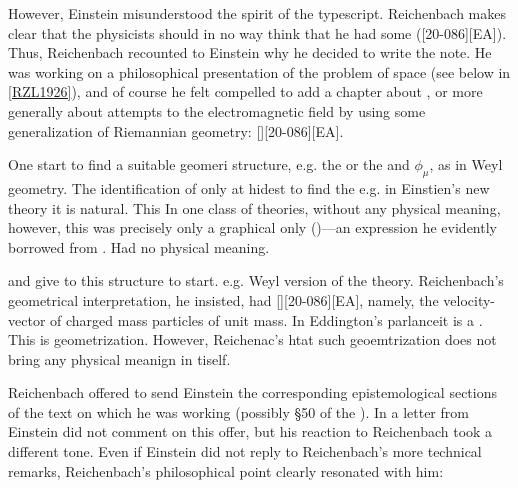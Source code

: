 \documentclass[draft]{article}
\begin{document}
However, Einstein misunderstood the spirit of the typescript. Reichenbach makes clear that the physicists should in no way think that he had some  ([20-086][EA]). Thus, Reichenbach recounted to Einstein why he decided to write the note. He was working on a philosophical presentation of the problem of space (see below in \cref{RZL1926}), and of course he felt compelled to add a chapter about , or more generally about attempts to  the electromagnetic field by using some generalization of Riemannian geometry: [][20-086][EA]. 

One start to find a suitable geomeri structure, e.g. the \Gtmn or the \gmn and $\phi_\mu$, as in Weyl geometry. The identification of only at hidest to find the e.g. in Einstien's new theory it is natural. This  In one class of theories, \Gtmn without any physical meaning, however, this was precisely only a graphical only  ()---an expression he evidently borrowed from \citet[294ff.]{Eddington1925a}. Had no physical meaning.

\Gtmn and give to this structure to start. e.g. Weyl version of the theory. Reichenbach's geometrical interpretation, he insisted, had [][20-086\me][EA], namely, the velocity-vector of charged mass particles of unit mass. In Eddington's parlanceit is a . This is geometrization. However, Reichenac's htat such geoemtrization does not bring any physical meanign in tiself.

Reichenbach offered to send Einstein the corresponding epistemological sections of the text on which he was working (possibly \S50 of the \Ap). In a letter from  Einstein did not comment on this offer, but his reaction to Reichenbach took a different tone. Even if Einstein did not reply to Reichenbach's more technical remarks, Reichenbach's philosophical point clearly resonated with him:
\end{document}
